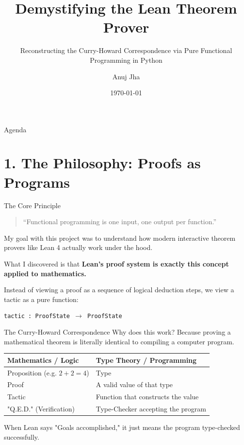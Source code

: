 \documentclass[aspectratio=169, 10pt]{beamer}
\title{Demystifying the Lean Theorem Prover}
\subtitle{Reconstructing the Curry-Howard Correspondence via Pure Functional Programming in Python}
\author{Anuj Jha} %
\date{\today}
\institute{SLP: Prof. Sudarshan Vijay}
\begin{document}
\maketitle

\begin{frame}{Agenda}
    \tableofcontents
\end{frame}

\section{1. The Philosophy: Proofs as Programs}

\begin{frame}{The Core Principle}
    \begin{quote}
        ``Functional programming is one input, one output per function.''
    \end{quote}
    \vspace{1em}
    
    My goal with this project was to understand how modern interactive theorem provers like Lean 4 actually work under the hood. 
    
    What I discovered is that \textbf{Lean's proof system is exactly this concept applied to mathematics.}
    
    \vspace{1em}
    Instead of viewing a proof as a sequence of logical deduction steps, we view a tactic as a pure function:
    \begin{center}
    \texttt{tactic : ProofState $\rightarrow$ ProofState}
    \end{center}
\end{frame}

\begin{frame}{The Curry-Howard Correspondence}
    Why does this work? Because proving a mathematical theorem is literally identical to compiling a computer program.
    
    \vspace{1em}
    \begin{table}
        \centering
        \begin{tabular}{ll}
            \toprule
            \textbf{Mathematics / Logic} & \textbf{Type Theory / Programming} \\
            \midrule
            Proposition (e.g. $2+2=4$) & Type \\
            Proof & A valid value of that type \\
            Tactic & Function that constructs the value \\
            "Q.E.D." (Verification) & Type-Checker accepting the program \\
            \bottomrule
        \end{tabular}
    \end{table}
    \vspace{1em}
    When Lean says "Goals accomplished," it just means the program type-checked successfully.
\end{frame}
\end{document}
